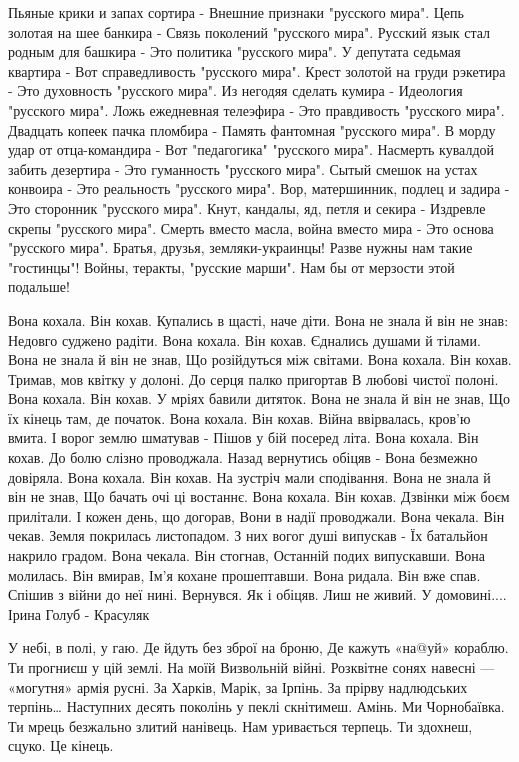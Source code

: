  
 
 
 
 

Пьяные крики и запах сортира -
Внешние признаки "русского мира".
Цепь золотая на шее банкира -
Связь поколений "русского мира".
Русский язык стал родным для башкира -
Это политика "русского мира".
У депутата седьмая квартира -
Вот справедливость "русского мира".
Крест золотой на груди рэкетира -
Это духовность "русского мира".
Из негодяя сделать кумира -
Идеология "русского мира".
Ложь ежедневная телеэфира -
Это правдивость "русского мира".
Двадцать копеек пачка пломбира -
Память фантомная "русского мира".
В морду удар от отца-командира -
Вот "педагогика" "русского мира".
Насмерть кувалдой забить дезертира -
Это гуманность "русского мира".
Сытый смешок на устах конвоира -
Это реальность "русского мира".
Вор, матершинник, подлец и задира -
Это сторонник "русского мира".
Кнут, кандалы, яд, петля и секира -
Издревле скрепы "русского мира".
Смерть вместо масла, война вместо мира -
Это основа "русского мира".
Братья, друзья, земляки-украинцы!
Разве нужны нам такие "гостинцы"!
Войны, теракты, "русские марши".
Нам бы от мерзости этой подальше!

Вона кохала. Він кохав.
Купались в щасті, наче діти.
Вона не знала й він не знав:
Недовго суджено радіти.
Вона кохала. Він кохав.
Єднались душами й тілами.
Вона не знала й він не знав,
Що розійдуться між світами.
Вона кохала. Він кохав.
Тримав, мов квітку у долоні.
До серця палко пригортав
В любові чистої полоні.
Вона кохала. Він кохав.
У мріях бавили дитяток.
Вона не знала й він не знав,
Що їх кінець там, де початок.
Вона кохала. Він кохав.
Війна ввірвалась, кров'ю вмита.
І ворог землю шматував -
Пішов у бій посеред літа.
Вона кохала. Він кохав.
До болю слізно проводжала.
Назад вернутись обіцяв -
Вона безмежно довіряла.
Вона кохала. Він кохав.
На зустріч мали сподівання.
Вона не знала й він не знав,
Що бачать очі ці востаннє.
Вона кохала. Він кохав.
Дзвінки між боєм прилітали.
І кожен день, що догорав,
Вони в надії проводжали.
Вона чекала. Він чекав.
Земля покрилась листопадом.
З них вогог душі випускав -
Їх батальйон накрило градом.
Вона чекала. Він стогнав,
Останній подих випускавши.
Вона молилась. Він вмирав,
Ім'я кохане прошептавши.
Вона ридала. Він вже спав.
Спішив з війни до неї нині.
Вернувся. Як і обіцяв.
Лиш не живий. У домовині....
Ірина Голуб - Красуляк

У небі, в полі, у гаю. Де йдуть без зброї на броню, Де кажуть «на@уй» кораблю.
Ти прогниєш у цій землі.  На моїй Визвольній війні. Розквітне сонях навесні —
«могутня» армія русні. За Харків, Марік, за Ірпінь. За прірву надлюдських
терпінь… Наступних десять поколінь у пеклі скнітимеш. Амінь. Ми Чорнобаївка. Ти
мрець безжально злитий нанівець.  Нам уривається терпець. Ти здохнеш, сцуко. Це
кінець.
